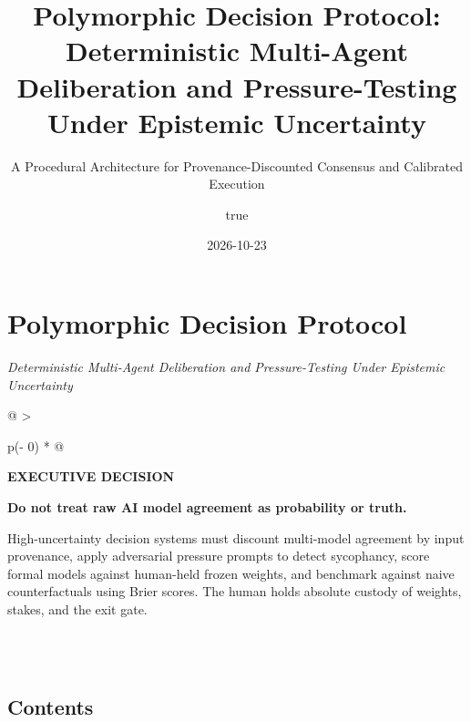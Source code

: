 \documentclass[
]{article}
\title{Polymorphic Decision Protocol: Deterministic Multi-Agent
Deliberation and Pressure-Testing Under Epistemic Uncertainty}
\subtitle{A Procedural Architecture for Provenance-Discounted Consensus
and Calibrated Execution}
\author{true}
\date{2026-10-23}
\begin{document}
\maketitle

{
\setcounter{tocdepth}{3}
\tableofcontents
}
\section{Polymorphic Decision
Protocol}\label{polymorphic-decision-protocol}

\emph{Deterministic Multi-Agent Deliberation and Pressure-Testing Under
Epistemic Uncertainty}

\begin{longtable}[]{@{}
  >{\raggedright\arraybackslash}p{(\columnwidth - 0\tabcolsep) * }@{}}
\toprule\noalign{}
\begin{minipage}[b]{\linewidth}\raggedright
\textbf{EXECUTIVE DECISION}

\textbf{Do not treat raw AI model agreement as probability or truth.}

High-uncertainty decision systems must discount multi-model agreement by
input provenance, apply adversarial pressure prompts to detect
sycophancy, score formal models against human-held frozen weights, and
benchmark against naive counterfactuals using Brier scores. The human
holds absolute custody of weights, stakes, and the exit gate.
\end{minipage} \\
\midrule\noalign{}
\endhead
\bottomrule\noalign{}
\endlastfoot
 \\
\end{longtable}

\subsection{Contents}\label{contents}
\end{document}
